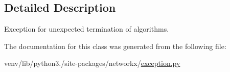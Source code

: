 \subsection{Detailed Description}
\begin{DoxyVerb}Exception for unexpected termination of algorithms.\end{DoxyVerb}
 

The documentation for this class was generated from the following file\+:\begin{DoxyCompactItemize}
\item 
venv/lib/python3./site-\/packages/networkx/\hyperlink{exception_8py}{exception.\+py}\end{DoxyCompactItemize}
